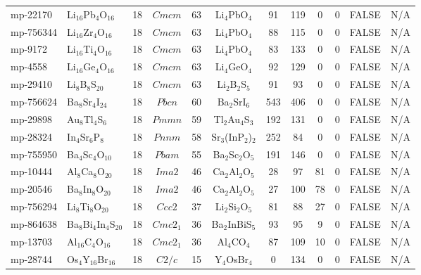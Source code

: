 {\begin{longtable}{llcccccccccc}
    mp-22170 & Li$_{16}$Pb$_{4}$O$_{16}$ & 18    & $Cmcm$ & 63    & Li$_{4}$PbO$_{4}$ & 91    & 119   & 0     & 0     & FALSE & N/A \\
    mp-756344 & Li$_{16}$Zr$_{4}$O$_{16}$ & 18    & $Cmcm$ & 63    & Li$_{4}$PbO$_{4}$ & 88    & 115   & 0     & 0     & FALSE & N/A \\
    mp-9172 & Li$_{16}$Ti$_{4}$O$_{16}$ & 18    & $Cmcm$ & 63    & Li$_{4}$PbO$_{4}$ & 83    & 133   & 0     & 0     & FALSE & N/A \\
    mp-4558 & Li$_{16}$Ge$_{4}$O$_{16}$ & 18    & $Cmcm$ & 63    & Li$_{4}$GeO$_{4}$ & 92    & 129   & 0     & 0     & FALSE & N/A \\
    mp-29410 & Li$_{8}$B$_{8}$S$_{20}$ & 18    & $Cmcm$ & 63    & Li$_{2}$B$_{2}$S$_{5}$ & 91    & 93    & 0     & 0     & FALSE & N/A \\
    mp-756624 & Ba$_{8}$Sr$_{4}$I$_{24}$ & 18    & $Pbcn$ & 60    & Ba$_{2}$SrI$_{6}$ & 543   & 406   & 0     & 0     & FALSE & N/A \\
    mp-29898 & Au$_{8}$Tl$_{4}$S$_{6}$ & 18    & $Pmmn$ & 59    & Tl$_{2}$Au$_{4}$S$_{3}$ & 192   & 131   & 0     & 0     & FALSE & N/A \\
    mp-28324 & In$_{4}$Sr$_{6}$P$_{8}$ & 18    & $Pnnm$ & 58    & Sr$_{3}$(InP$_{2}$)$_{2}$ & 252   & 84    & 0     & 0     & FALSE & N/A \\
    mp-755950 & Ba$_{4}$Sc$_{4}$O$_{10}$ & 18    & $Pbam$ & 55    & Ba$_{2}$Sc$_{2}$O$_{5}$ & 191   & 146   & 0     & 0     & FALSE & N/A \\
    mp-10444 & Al$_{8}$Ca$_{8}$O$_{20}$ & 18    & $Ima2$ & 46    & Ca$_{2}$Al$_{2}$O$_{5}$ & 28    & 97    & 81    & 0     & FALSE & N/A \\
    mp-20546 & Ba$_{8}$In$_{8}$O$_{20}$ & 18    & $Ima2$ & 46    & Ca$_{2}$Al$_{2}$O$_{5}$ & 27    & 100   & 78    & 0     & FALSE & N/A \\
    mp-756294 & Li$_{8}$Ti$_{8}$O$_{20}$ & 18    & $Ccc2$ & 37    & Li$_{2}$Si$_{2}$O$_{5}$ & 81    & 88    & 27    & 0     & FALSE & N/A \\
    mp-864638 & Ba$_{8}$Bi$_{4}$In$_{4}$S$_{20}$ & 18    & $Cmc2_1$ & 36    & Ba$_{2}$InBiS$_{5}$ & 93    & 95    & 9     & 0     & FALSE & N/A \\
    mp-13703 & Al$_{16}$C$_{4}$O$_{16}$ & 18    & $Cmc2_1$ & 36    & Al$_{4}$CO$_{4}$ & 87    & 109   & 10    & 0     & FALSE & N/A \\
    mp-28744 & Os$_{4}$Y$_{16}$Br$_{16}$ & 18    & $C2/c$ & 15    & Y$_{4}$OsBr$_{4}$ & 0     & 134   & 0     & 0     & FALSE & N/A \\

\end{longtable}}
